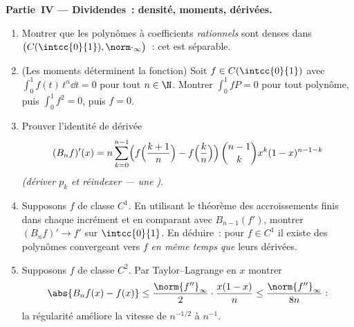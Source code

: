 \begin{problem}
\medskip
\noindent\textbf{Partie~IV --- Dividendes~: densité, moments,
dérivées.}
\begin{enumerate}[resume]
  \item Montrer que les polynômes à coefficients \emph{rationnels}
        sont denses dans $\bigl(C(\intcc{0}{1}),
        \norm\cdot_\infty\bigr)$~: cet  est
        séparable.
  \item (Les moments déterminent la fonction) Soit $f \in
        C(\intcc{0}{1})$ avec $\int_0^1 f(t)\,t^n \dd t = 0$
        pour tout $n \in \N$. Montrer $\int_0^1 f P = 0$ pour tout
        polynôme, puis $\int_0^1 f^2 = 0$, puis $f = 0$.
  \item Prouver l'identité de dérivée
        \[
        (B_nf)'(x) = n\sum_{k=0}^{n-1}\Bigl(
        f\Bigl(\frac{k+1}{n}\Bigr) -
        f\Bigl(\frac kn\Bigr)\Bigr)\,
        \binom{n-1}{k}x^k(1-x)^{n-1-k}
        \]
        \emph{(dériver $p_k$ et réindexer --- une )}.
  \item Supposons $f$ de classe $C^1$. En utilisant le théorème des
        accroissements finis dans chaque incrément et en comparant
        avec $B_{n-1}(f')$, montrer $(B_nf)' \to f'$  sur
        $\intcc{0}{1}$. En déduire~: pour $f \in C^1$ il existe des
        polynômes convergeant vers $f$ \emph{en même temps que} leurs
        dérivées.
  \item Supposons $f$ de classe $C^2$. Par Taylor--Lagrange en $x$
        montrer
        \[
        \abs{B_nf(x) - f(x)} \leq
        \frac{\norm{f''}_\infty}{2}\cdot\frac{x(1-x)}{n}
        \leq \frac{\norm{f''}_\infty}{8n} :
        \]
        la régularité améliore la vitesse de $n^{-1/2}$ à
        $n^{-1}$.
\end{enumerate}


\end{problem}
